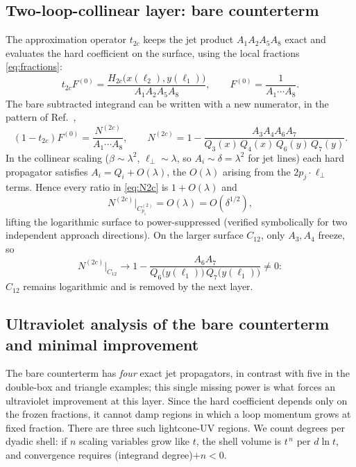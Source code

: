\documentclass[11pt]{article}
\begin{document}
\subsection{Two-loop-collinear layer: bare counterterm}

The approximation operator $t_{2c}$ keeps the jet product $A_1A_2A_5A_8$ exact and evaluates the
hard coefficient on the surface, using the local fractions \eqref{eq:fractions}:
\begin{equation}
t_{2c}F^{(0)}=\frac{H_{2c}\big(x(\ell_2),y(\ell_1)\big)}{A_1A_2A_5A_8},
\qquad
F^{(0)}=\frac{1}{A_1\cdots A_8}.
\end{equation}
The bare subtracted integrand can be written with a new numerator, in the pattern of
Ref.~\cite{AS},
\begin{equation}
(1-t_{2c})F^{(0)}=\frac{N^{(2c)}}{A_1\cdots A_8},
\qquad
N^{(2c)}=1-\frac{A_3A_4A_6A_7}{Q_3(x)\,Q_4(x)\,Q_6(y)\,Q_7(y)} .
\label{eq:N2c}
\end{equation}
In the collinear scaling ($\beta\sim\lambda^2$, $\ell_\perp\sim\lambda$, so $A_i\sim\delta=\lambda^2$
for jet lines) each hard propagator satisfies $A_i=Q_i+O(\lambda)$, the $O(\lambda)$ arising from
the $2p_j\!\cdot\!\ell_\perp$ terms. Hence every ratio in \eqref{eq:N2c} is $1+O(\lambda)$ and
\begin{equation}
N^{(2c)}\big|_{C^{(2)}_{p_1}}=O(\lambda)=O(\delta^{1/2}),
\end{equation}
lifting the logarithmic surface to power-suppressed (verified symbolically for two independent
approach directions). On the larger surface $C_{12}$, only $A_3,A_4$ freeze, so
\begin{equation}
N^{(2c)}\big|_{C_{12}}\longrightarrow 1-\frac{A_6A_7}{Q_6\big(y(\ell_1)\big)\,Q_7\big(y(\ell_1)\big)}
\neq0 :
\end{equation}
$C_{12}$ remains logarithmic and is removed by the next layer.

\subsection{Ultraviolet analysis of the bare counterterm and minimal improvement}
\label{sec:UV2c}

The bare counterterm has \emph{four} exact jet propagators, in contrast with five in the double-box
and triangle examples; this single missing power is what forces an ultraviolet improvement at this
layer. Since the hard coefficient depends only on the frozen fractions, it cannot damp regions in
which a loop momentum grows at fixed fraction. There are three such lightcone-UV regions. We count
degrees per dyadic shell: if $n$ scaling variables grow like $t$, the shell volume is $t^{\,n}$
per $d\ln t$, and convergence requires (integrand degree)$+n<0$.
\end{document}

